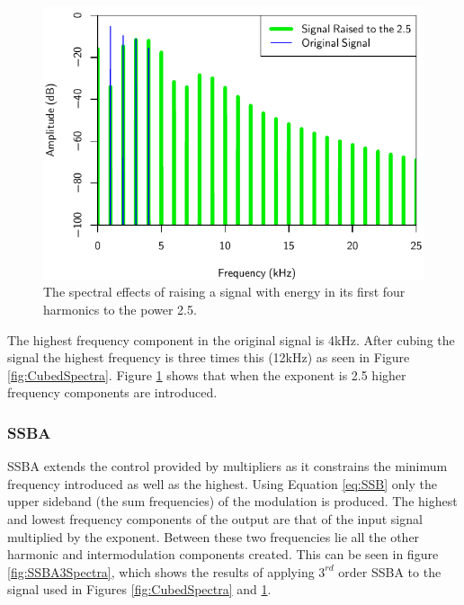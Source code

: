 			\begin{figure}[h!]
				\centering
				\includegraphics{chapter5/Images/RaisedToTwoAndAHalfSpectra.pdf}
				\caption{The spectral effects of raising a signal with energy in its first four harmonics
					 to the power 2.5.}
				\label{fig:TwoAndAHalfSpectra}
			\end{figure}

			The highest frequency component in the original signal is 4kHz. After cubing the signal the highest
			frequency is three times this (12kHz) as seen in Figure \ref{fig:CubedSpectra}. Figure
			\ref{fig:TwoAndAHalfSpectra} shows that when the exponent is 2.5 higher frequency components are
			introduced. 

		\subsubsection*{SSBA}
			SSBA extends the control provided by multipliers as it constrains the minimum frequency introduced
			as well as the highest. Using Equation \ref{eq:SSB} only the upper sideband (the sum frequencies)
			of the modulation is produced. The highest and lowest frequency components of the output are that
			of the input signal multiplied by the exponent. Between these two frequencies lie all the other
			harmonic and intermodulation components created. This can be seen in figure \ref{fig:SSBA3Spectra},
			which shows the results of applying $3^{rd}$ order SSBA to the signal used in Figures
			\ref{fig:CubedSpectra} and \ref{fig:TwoAndAHalfSpectra}. 			
			
